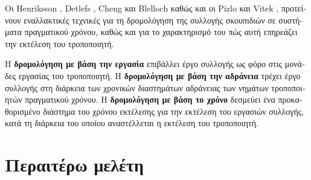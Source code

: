 \begin{greek}
Οι Henriksson \cite{henriksson1998scheduling}, Detlefs \cite{DBLP:conf/isorc/Detlefs04},
Cheng και Blelloch \cite{DBLP:conf/pldi/ChengB01} καθώς και
οι Pizlo και Vitek \cite{DBLP:conf/pldi/PizloPS08}, προτείνουν
εναλλακτικές τεχνικές για τη δρομολόγηση της συλλογής σκουπιδιών
σε συστήματα πραγματικού χρόνου, καθώς και για το χαρακτηρισμό
του πώς αυτή επηρεάζει την εκτέλεση του τροποποιητή.

Η \textbf{δρομολόγηση με βάση την εργασία} επιβάλλει έργο
συλλογής ως φόρο στις μονάδες εργασίας του τροποποιητή. Η
\textbf{δρομολόγηση με βάση την αδράνεια} τρέχει έργο συλλογής
στη διάρκεια των χρονικών διαστημάτων αδράνειας των νημάτων
τροποποιητών πραγματικού χρόνου.
Η \textbf{δρομολόγηση με βάση το χρόνο} δεσμεύει ένα προκαθορισμένο
διάστημα του χρόνου εκτέλεσης για την εκτέλεση του εργασιών
συλλογής, κατά τη διάρκεια του οποίου αναστέλλεται η εκτέλεση του
τροποποιητή.

\section{Περαιτέρω μελέτη}

\end{greek}
